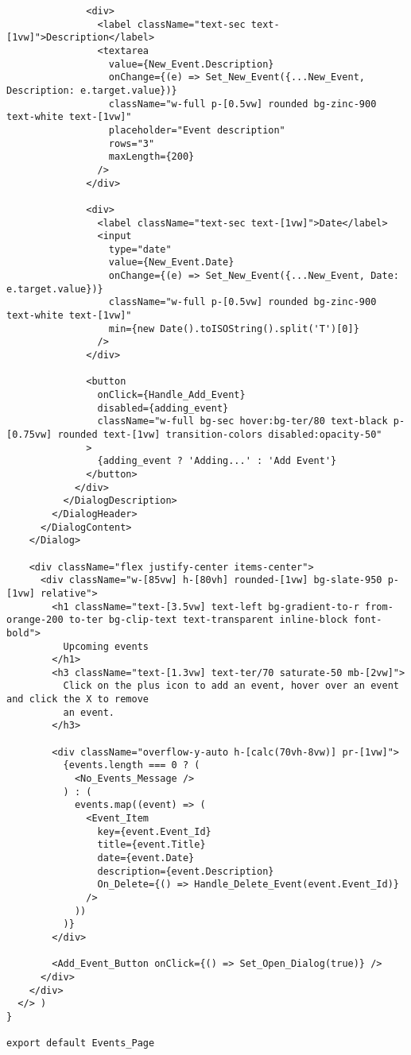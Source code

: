 \begin{verbatim}
              <div>
                <label className="text-sec text-[1vw]">Description</label>
                <textarea
                  value={New_Event.Description}
                  onChange={(e) => Set_New_Event({...New_Event, Description: e.target.value})}
                  className="w-full p-[0.5vw] rounded bg-zinc-900 text-white text-[1vw]"
                  placeholder="Event description"
                  rows="3"
                  maxLength={200}
                />
              </div>

              <div>
                <label className="text-sec text-[1vw]">Date</label>
                <input
                  type="date"
                  value={New_Event.Date}
                  onChange={(e) => Set_New_Event({...New_Event, Date: e.target.value})}
                  className="w-full p-[0.5vw] rounded bg-zinc-900 text-white text-[1vw]"
                  min={new Date().toISOString().split('T')[0]}
                />
              </div>

              <button
                onClick={Handle_Add_Event}
                disabled={adding_event}
                className="w-full bg-sec hover:bg-ter/80 text-black p-[0.75vw] rounded text-[1vw] transition-colors disabled:opacity-50"
              >
                {adding_event ? 'Adding...' : 'Add Event'}
              </button>
            </div>
          </DialogDescription>
        </DialogHeader>
      </DialogContent>
    </Dialog>

    <div className="flex justify-center items-center">
      <div className="w-[85vw] h-[80vh] rounded-[1vw] bg-slate-950 p-[1vw] relative">
        <h1 className="text-[3.5vw] text-left bg-gradient-to-r from-orange-200 to-ter bg-clip-text text-transparent inline-block font-bold">
          Upcoming events
        </h1>
        <h3 className="text-[1.3vw] text-ter/70 saturate-50 mb-[2vw]">
          Click on the plus icon to add an event, hover over an event and click the X to remove
          an event.
        </h3>

        <div className="overflow-y-auto h-[calc(70vh-8vw)] pr-[1vw]">
          {events.length === 0 ? (
            <No_Events_Message />
          ) : (
            events.map((event) => (
              <Event_Item
                key={event.Event_Id}
                title={event.Title}
                date={event.Date}
                description={event.Description}
                On_Delete={() => Handle_Delete_Event(event.Event_Id)}
              />
            ))
          )}
        </div>

        <Add_Event_Button onClick={() => Set_Open_Dialog(true)} />
      </div>
    </div>
  </> )
}

export default Events_Page
\end{verbatim}

